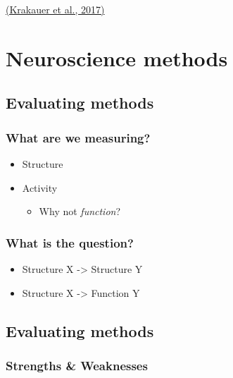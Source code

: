 \documentclass[]{article}
\providecommand{\tightlist}{%
  \setlength{\itemsep}{0pt}\setlength{\parskip}{0pt}}
\begin{document}
\href{http://dx.doi.org/10.1016/j.neuron.2016.12.041}{(Krakauer et al.,
2017)}

\hypertarget{neuroscience-methods}{%
\section{Neuroscience methods}\label{neuroscience-methods}}

\hypertarget{evaluating-methods}{%
\subsection{Evaluating methods}\label{evaluating-methods}}

\hypertarget{what-are-we-measuring}{%
\subsubsection{What are we measuring?}\label{what-are-we-measuring}}

\begin{itemize}
\tightlist
\item
  Structure
\item
  Activity

  \begin{itemize}
  \tightlist
  \item
    Why not \emph{function}?
  \end{itemize}
\end{itemize}

\hypertarget{what-is-the-question}{%
\subsubsection{What is the question?}\label{what-is-the-question}}

\begin{itemize}
\tightlist
\item
  Structure X -\textgreater{} Structure Y
\item
  Structure X -\textgreater{} Function Y
\end{itemize}

\hypertarget{evaluating-methods-1}{%
\subsection{Evaluating methods}\label{evaluating-methods-1}}

\hypertarget{strengths-weaknesses}{%
\subsubsection{Strengths \& Weaknesses}\label{strengths-weaknesses}}
\end{document}
